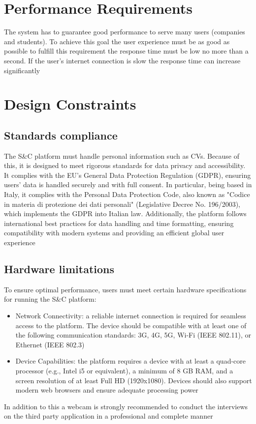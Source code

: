 \section{Performance Requirements}
The system has to guarantee good performance to serve many users (companies and students). To achieve this goal the user experience must be as good as possible to fulfill this requirement the response time must be low no more than a second. If the user’s internet connection is slow the response time can increase significantly

\section{Design Constraints}
\subsection{Standards compliance}
The S\&C platform must handle personal information such as CVs. Because of this, it is designed to meet rigorous standards for data privacy and accessibility. It complies with the EU's General Data Protection Regulation (GDPR), ensuring users' data is handled securely and with full consent. In particular, being based in Italy, it complies with the Personal Data Protection Code, also known as "Codice in materia di protezione dei dati personali" (Legislative Decree No. 196/2003), which implements the GDPR into Italian law.
Additionally, the platform follows international best practices for data handling and time formatting, ensuring compatibility with modern systems and providing an efficient global user experience

\subsection{Hardware limitations}
To ensure optimal performance, users must meet certain hardware specifications for running the S\&C platform:
\begin{itemize}
    \item Network Connectivity: a reliable internet connection is required for seamless access to the platform. The device should be compatible with at least one of the following communication standards: 3G, 4G, 5G, Wi-Fi (IEEE 802.11), or Ethernet (IEEE 802.3)
    \item Device Capabilities: the platform requires a device with at least a quad-core processor (e.g., Intel i5 or equivalent), a minimum of 8 GB RAM, and a screen resolution of at least Full HD (1920x1080). Devices should also support modern web browsers and ensure adequate processing power
\end{itemize}
In addition to this a webcam is strongly recommended to conduct the interviews on the third party application in a professional and complete manner

